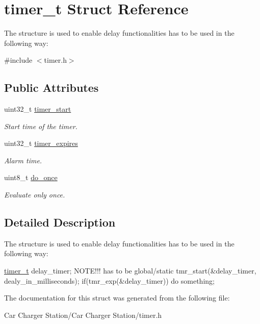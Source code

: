 \hypertarget{structtimer__t}{\section{timer\+\_\+t Struct Reference}
\label{structtimer__t}
}


The structure is used to enable delay functionalities has to be used in the following way\+:  




{\ttfamily \#include $<$timer.\+h$>$}

\subsection*{Public Attributes}
\begin{DoxyCompactItemize}
\item 
\hypertarget{structtimer__t_a080acd8538cab58318498768716925cd}{uint32\+\_\+t \hyperlink{structtimer__t_a080acd8538cab58318498768716925cd}{timer\+\_\+start}}\label{structtimer__t_a080acd8538cab58318498768716925cd}

\begin{DoxyCompactList}\small\item\em Start time of the timer. \end{DoxyCompactList}\item 
\hypertarget{structtimer__t_a253f5d8522b9d7cc268c2164bb35960e}{uint32\+\_\+t \hyperlink{structtimer__t_a253f5d8522b9d7cc268c2164bb35960e}{timer\+\_\+expires}}\label{structtimer__t_a253f5d8522b9d7cc268c2164bb35960e}

\begin{DoxyCompactList}\small\item\em Alarm time. \end{DoxyCompactList}\item 
\hypertarget{structtimer__t_ac09f40fc0fe9b649a369895f32859d8e}{uint8\+\_\+t \hyperlink{structtimer__t_ac09f40fc0fe9b649a369895f32859d8e}{do\+\_\+once}}\label{structtimer__t_ac09f40fc0fe9b649a369895f32859d8e}

\begin{DoxyCompactList}\small\item\em Evaluate only once. \end{DoxyCompactList}\end{DoxyCompactItemize}


\subsection{Detailed Description}
The structure is used to enable delay functionalities has to be used in the following way\+: 

\hyperlink{structtimer__t}{timer\+\_\+t} delay\+\_\+timer; N\+O\+T\+E!!! has to be global/static tmr\+\_\+start(\&delay\+\_\+timer, dealy\+\_\+in\+\_\+milliseconds); if(tmr\+\_\+exp(\&delay\+\_\+timer)) do something; 

The documentation for this struct was generated from the following file\+:\begin{DoxyCompactItemize}
\item 
Car Charger Station/\+Car Charger Station/timer.\+h\end{DoxyCompactItemize}

